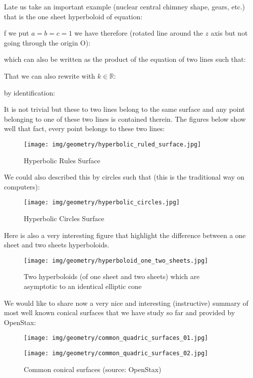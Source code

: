 {	Late us take an important example (nuclear central chimney shape, gears, etc.) that is the one sheet hyperboloid of equation:
	
	f we put $a=b=c=1$ we have therefore (rotated line around the $z$ axis but not going through the origin O):
	
	which can also be written as the product of the equation of two lines such that:
	
	That we can also rewrite with $k \in \mathbb{R}$:
	
	by identification:
	
	It is not trivial but these to two lines belong to the same surface and any point belonging to one of these two lines is contained therein. The figures below show well that fact, every point belongs to these two lines:
	\begin{figure}[H]
		\centering
		\texttt{[image: img/geometry/hyperbolic\_ruled\_surface.jpg]}
		\caption{Hyperbolic Rules Surface}
	\end{figure}
	We could also described this by circles such that (this is the traditional way on computers):
	
	\begin{figure}[H]
		\centering
		\texttt{[image: img/geometry/hyperbolic\_circles.jpg]}
		\caption{Hyperbolic Circles Surface}
	\end{figure}
	Here is also a very interesting figure that highlight the difference between a one sheet and two sheets hyperboloids\label{two sheets hyperboloid}.
	\begin{figure}[H]
		\centering
		\texttt{[image: img/geometry/hyperboloid\_one\_two\_sheets.jpg]}
		\caption{Two hyperboloids (of one sheet and two sheets) which are asymptotic to an identical elliptic cone}
	\end{figure}
	
	We would like to share now a very nice and interesting (instructive) summary of most well known conical surfaces that we have study so far and provided by OpenStax:
	\begin{figure}[H]
		\centering
		\texttt{[image: img/geometry/common\_quadric\_surfaces\_01.jpg]}
	\end{figure}
	\begin{figure}[H]
		\centering
		\texttt{[image: img/geometry/common\_quadric\_surfaces\_02.jpg]}
		\caption[Common conical surfaces]{Common conical surfaces (source: OpenStax)}
	\end{figure}
	
	
	
}
